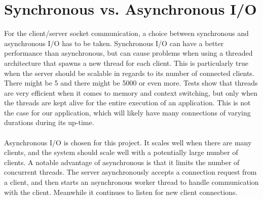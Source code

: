






\section{Synchronous vs. Asynchronous I/O}
For the client/server socket communication, a choice between synchronous and asynchronous I/O has to be taken.
Synchronous I/O can have a better performance than asynchronous, but can cause problems when using a threaded architecture that spawns a new thread for each client. This is particularly true when the server should be scalable in regards to its number of connected clients. There might be 5 and there might be 5000 or even more.
Tests show that threads are very efficient when it comes to memory and context switching, but only when the threads are kept alive for the entire execution of an application. This is not the case for our application, which will likely have many connections of varying durations during its up-time. \\\\
Asynchronous I/O is chosen for this project. It scales well when there are many clients, and the system should scale well with a potentially large number of clients. A notable advantage of asynchronous is that it limits the number of concurrent threads. The server asynchronously accepts a connection request from a client, and then starts an asynchronous worker thread to handle communication with the client. Meanwhile it continues to listen for new client connections.



